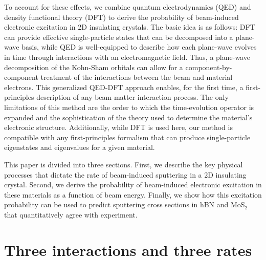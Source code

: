 \documentclass{article}
\begin{document}
To account for these effects, we combine quantum electrodynamics (QED) and
density functional theory (DFT) to derive the probability of beam-induced
electronic excitation in 2D insulating crystals.
The basic idea is as follows: DFT can provide effective single-particle states
that can be decomposed into a plane-wave basis,\cite{Hohenberg1964, Kohn1965,
Kresse1996a} while QED is well-equipped to describe how each plane-wave
evolves in time through interactions with an electromagnetic
field. \cite{Lourenco-Martins2021, Peskin1995, Lancaster2014}
Thus, a plane-wave decomposition of the Kohn-Sham orbitals can allow for a
component-by-component treatment of the interactions between the beam and
material electrons.
This generalized QED-DFT approach enables, for the first time, a
first-principles description of any beam-matter interaction process.
The only limitations of this method are the order to which the time-evolution
operator is expanded and the sophistication of the theory used to determine the
material's electronic structure.
Additionally, while DFT is used here, our method is compatible with any
first-principles formalism that can produce single-particle eigenstates and
eigenvalues for a given material.

This paper is divided into three sections.
First, we describe the key physical processes that dictate the rate of
beam-induced sputtering in a 2D insulating crystal.
Second, we derive the probability of beam-induced electronic excitation in
these materials as a function of beam energy.
Finally, we show how this excitation probability can be used to predict
sputtering cross sections in hBN and MoS$_2$ that quantitatively agree with
experiment.


\section{Three interactions and three rates}
\label{sec:bigPicture}
\end{document}
